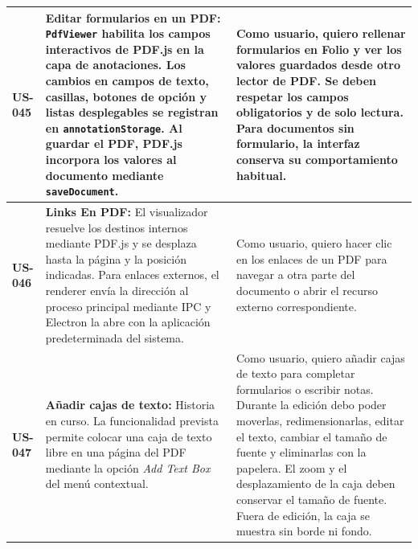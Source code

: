 \begin{longtable}{|l||p{7cm}|p{4.5cm}|}
\hline
\textbf{US-045} & \textbf{Editar formularios en un PDF:} \texttt{PdfViewer} habilita los campos interactivos de PDF.js en la capa de anotaciones. Los cambios en campos de texto, casillas, botones de opción y listas desplegables se registran en \texttt{annotationStorage}. Al guardar el PDF, PDF.js incorpora los valores al documento mediante \texttt{saveDocument}. & Como usuario, quiero rellenar formularios en Folio y ver los valores guardados desde otro lector de PDF. Se deben respetar los campos obligatorios y de solo lectura. Para documentos sin formulario, la interfaz conserva su comportamiento habitual.\\
\hline
\textbf{US-046} & \textbf{Links En PDF:} El visualizador resuelve los destinos internos mediante PDF.js y se desplaza hasta la página y la posición indicadas. Para enlaces externos, el renderer envía la dirección al proceso principal mediante IPC y Electron la abre con la aplicación predeterminada del sistema. & Como usuario, quiero hacer clic en los enlaces de un PDF para navegar a otra parte del documento o abrir el recurso externo correspondiente.\\
\hline
\textbf{US-047} & \textbf{Añadir cajas de texto:} Historia en curso. La funcionalidad prevista permite colocar una caja de texto libre en una página del PDF mediante la opción \emph{Add Text Box} del menú contextual. & Como usuario, quiero añadir cajas de texto para completar formularios o escribir notas. Durante la edición debo poder moverlas, redimensionarlas, editar el texto, cambiar el tamaño de fuente y eliminarlas con la papelera. El zoom y el desplazamiento de la caja deben conservar el tamaño de fuente. Fuera de edición, la caja se muestra sin borde ni fondo.\\
\hline

\end{longtable}
